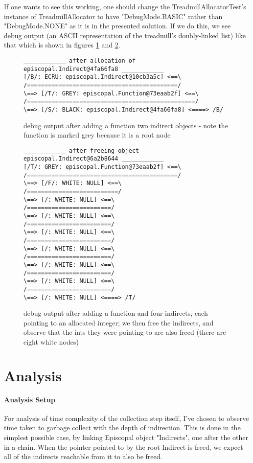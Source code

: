 \documentclass[]{article}
\begin{document}
If one wants to see this working, one should change the TreadmillAllocatorTest's instance of TreadmillAllocator to have "DebugMode.BASIC" rather than "DebugMode.NONE" as it is in the presented solution. If we do this, we see debug output (an ASCII representation of the treadmill's doubly-linked list) like that which is shown in figures \ref{fig:test:allocate} and \ref{fig:test:free}.

\begin{figure}
\begin{verbatim}
____________ after allocation of episcopal.Indirect@4fa66fa8 ____________
[/B/: ECRU: episcopal.Indirect@10cb3a5c] <==\
/===========================================/
\==> [/T/: GREY: episcopal.Function@73eaab2f] <==\
/================================================/
\==> [/S/: BLACK: episcopal.Indirect@4fa66fa8] <====> /B/
\end{verbatim}
\caption{debug output after adding a function two indirect objects - note the function is marked grey because it is a root node\label{fig:test:allocate}}
\end{figure}

\begin{figure}
\begin{verbatim}
____________ after freeing object episcopal.Indirect@6a2b8644 ____________
[/T/: GREY: episcopal.Function@73eaab2f] <==\
/===========================================/
\==> [/F/: WHITE: NULL] <==\
/==========================/
\==> [/: WHITE: NULL] <==\
/========================/
\==> [/: WHITE: NULL] <==\
/========================/
\==> [/: WHITE: NULL] <==\
/========================/
\==> [/: WHITE: NULL] <==\
/========================/
\==> [/: WHITE: NULL] <==\
/========================/
\==> [/: WHITE: NULL] <==\
/========================/
\==> [/: WHITE: NULL] <====> /T/
\end{verbatim}
\caption{debug output after adding a function and four indirects, each pointing to an allocated integer; we then free the indirects, and observe that the ints they were pointing to are also freed (there are eight white nodes)\label{fig:test:free}}
\end{figure}


\section{Analysis}\label{sec:analysis}

\paragraph{Analysis Setup}
For analysis of time complexity of the collection step itself, I've chosen to observe time taken to garbage collect with the depth of indirection. This is done in the simplest possible case, by linking Episcopal object "Indirects", one after the other in a chain. When the pointer pointed to by the root Indirect is freed, we expect all of the indirects reachable from it to also be freed.
\end{document}
